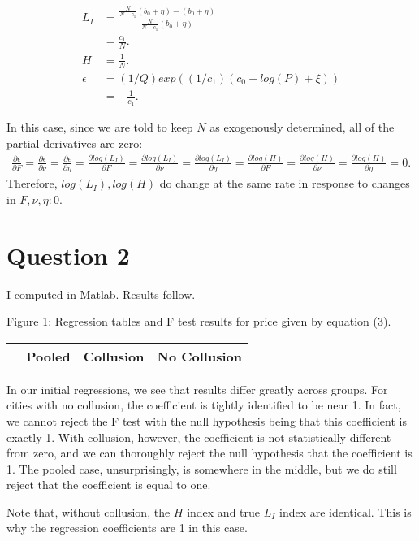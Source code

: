 \documentclass[11pt]{article} %
\begin{document}
\begin{align*}
L_I &= \frac{\frac{N}{N-c_1}(b_0 + \eta) - (b_0 + \eta)}{\frac{N}{N-c_1}(b_0 + \eta)}\\
&= \frac{c_1}{N}. \\
H &= \frac{1}{N}. \\
\epsilon &= (1/Q)exp((1/c_1)(c_0 - log(P) + \xi)) \\
&= - \frac{1}{c_1}.
\end{align*}

In this case, since we are told to keep $N$ as exogenously determined, all of the partial derivatives are zero:
\begin{align*}
\frac{\partial \epsilon}{\partial F} = \frac{\partial \epsilon}{\partial \nu} = \frac{\partial \epsilon}{\partial \eta} = \frac{\partial log(L_I)}{\partial F} = \frac{\partial log(L_I)}{\partial \nu} = \frac{\partial log(L_I)}{\partial \eta} = \frac{\partial log(H)}{\partial F} = \frac{\partial log(H)}{\partial \nu} = \frac{\partial log(H)}{\partial \eta} = 0.
\end{align*}
Therefore, $log(L_I),log(H)$ do change at the same rate in response to changes in $F,\nu,\eta: 0$.
\section{Question 2}
I computed in Matlab. Results follow.

\bigskip
\begin{center}
Figure 1: Regression tables and F test results for price given by equation (3).
\begin{tabular}{l | lll}
\hline
 & Pooled & Collusion & No Collusion \\
\hline \hline

\hline

\hline
\end{tabular}
\end{center}

\bigskip

In our initial regressions, we see that results differ greatly across groups. For cities with no collusion, the coefficient is tightly identified to be near 1. In fact, we cannot reject the F test with the null hypothesis being that this coefficient is exactly 1. With collusion, however, the coefficient is not statistically different from zero, and we can thoroughly reject the null hypothesis that the coefficient is 1. The pooled case, unsurprisingly, is somewhere in the middle, but we do still reject that the coefficient is equal to one.

Note that, without collusion, the $H$ index and true $L_I$ index are identical. This is why the regression coefficients are 1 in this case.
\end{document}
